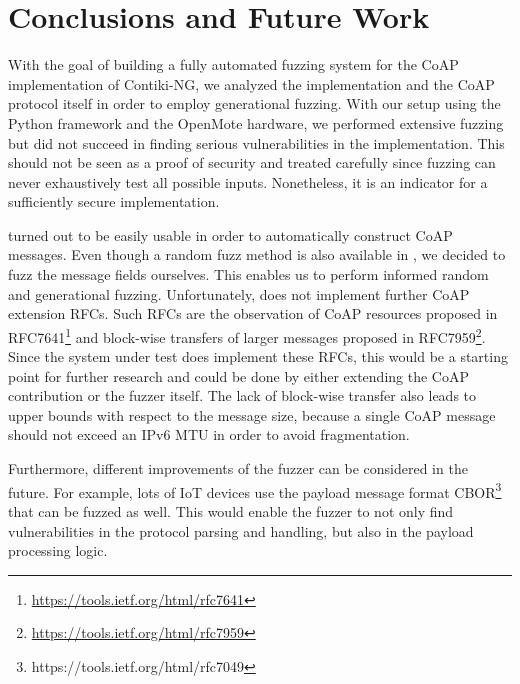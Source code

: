 \section{Conclusions and Future Work}
\label{section:conclusion}


With the goal of building a fully automated fuzzing system for the CoAP implementation of Contiki-NG, we analyzed the implementation and the CoAP protocol itself in order to employ generational fuzzing. With our setup using the Python framework \scapy and the OpenMote hardware, we performed extensive fuzzing but did not succeed in finding serious vulnerabilities in the implementation. This should not be seen as a proof of security and treated carefully since fuzzing can never exhaustively test all possible inputs. Nonetheless, it is an indicator for a sufficiently secure implementation.

\scapy turned out to be easily usable in order to automatically construct CoAP messages. Even though a random fuzz method is also available in \scapy, we decided to fuzz the message fields ourselves. This enables us to perform informed random and generational fuzzing. Unfortunately, \scapy does not implement further CoAP extension RFCs. Such RFCs are the observation of CoAP resources proposed in RFC7641\footnote{\url{https://tools.ietf.org/html/rfc7641}} and block-wise transfers of larger messages proposed in RFC7959\footnote{\url{https://tools.ietf.org/html/rfc7959}}. Since the system under test does implement these RFCs, this would be a starting point for further research and could be done by either extending the \scapy CoAP contribution or the fuzzer itself. The lack of block-wise transfer also leads to upper bounds with respect to the message size, because a single CoAP message should not exceed an IPv6 MTU in order to avoid fragmentation.

Furthermore, different improvements of the fuzzer can be considered in the future. For example, lots of IoT devices use the payload message format CBOR\footnote{https://tools.ietf.org/html/rfc7049} that can be fuzzed as well. This would enable the fuzzer to not only find vulnerabilities in the protocol parsing and handling, but also in the payload processing logic. 

